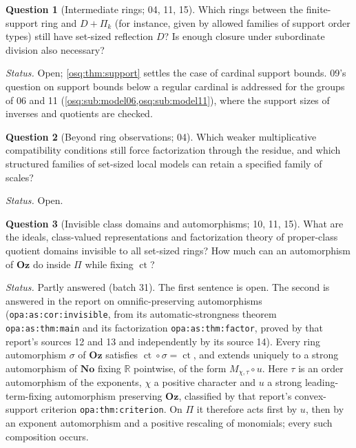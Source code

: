 \documentclass[11pt,letterpaper]{article}
\numberwithin{equation}{section}
\theoremstyle{definition}
\newtheorem{question}[question]{Question}
\theoremstyle{remark}
\theoremstyle{plain}
\newcommand{\No}{\mathbf{No}}
\newcommand{\Oz}{\mathbf{Oz}}
\newcommand{\R}{\mathbb R}
\newcommand{\ct}{\operatorname{ct}}
\begin{document}
\begin{question}[Intermediate rings; 04, 11, 15]\label{osq:q:intermediate}
Which rings between the finite-support ring and $D+\Pi_k$ (for instance, given by allowed families of
support order types) still have set-sized reflection $D$? Is enough closure under subordinate division
also necessary?
\end{question}
\emph{Status.} Open; \cref{osq:thm:support} settles the case of cardinal support bounds. 09's question on
support bounds below a regular cardinal is addressed for the groups of 06 and 11
(\cref{osq:sub:model06,osq:sub:model11}), where the support sizes of inverses and quotients are checked.

\begin{question}[Beyond ring observations; 04]\label{osq:q:weaker}
Which weaker multiplicative compatibility conditions still force factorization through the residue, and
which structured families of set-sized local models can retain a specified family of scales?
\end{question}
\emph{Status.} Open.

\begin{question}[Invisible class domains and automorphisms; 10, 11, 15]\label{osq:q:invisible}
What are the ideals, class-valued representations and factorization theory of proper-class quotient
domains invisible to all set-sized rings? How much can an automorphism of $\Oz$ do inside $\Pi$ while
fixing $\ct$?
\end{question}
\emph{Status.} Partly answered (batch 31). The first sentence is open. The second is answered in the report on
omnific-preserving automorphisms \cite{RepoOpa} (\nolinkurl{opa:as:cor:invisible}, from its automatic-strongness
theorem \nolinkurl{opa:as:thm:main} and its factorization \nolinkurl{opa:as:thm:factor}, proved by that report's sources
12 and 13 and independently by its source 14). Every ring automorphism $\sigma$ of $\Oz$ satisfies $\ct\circ\sigma=\ct$,
and extends uniquely to a strong automorphism of $\No$ fixing $\R$ pointwise, of the form $M_{\chi,\tau}\circ u$.
Here $\tau$ is an order automorphism of the exponents, $\chi$ a positive character and $u$ a strong leading-term-fixing
automorphism preserving $\Oz$, classified by that report's convex-support criterion \nolinkurl{opa:thm:criterion}. On
$\Pi$ it therefore acts first by $u$, then by an exponent automorphism and a positive rescaling of monomials; every such
composition occurs.
\end{document}

